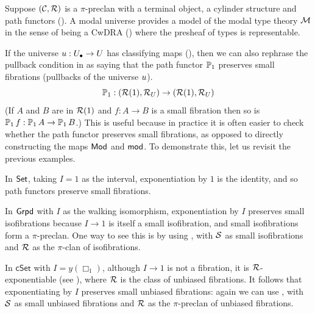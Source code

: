 \begin{proposition}
  Suppose $(\CC,\RR)$ is a $\pi$-preclan with a terminal object,
  a cylinder structure and path functors ().
  A modal universe provides a model of the modal type theory $\MM$
  in the sense of being a CwDRA (\cite[Definition 2]{birkedal2020})
  where the presheaf of types is representable.
\end{proposition}


If the universe $\uu : \Ulow \to \U$ has classifying maps
(),
then we can also rephrase the pullback condition in  as saying
that the path functor $\arr[1]$ preserves small fibrations
(pullbacks of the universe $\uu$).
\[ \arr[1] : (\RR(1),\RR_\U) \to (\RR(1),\RR_\U) \]
(If $A$ and $B$ are in $\RR(1)$ and $f : A \to B$ is a small fibration then
so is $\arr[1] f : \arr[1] A \to \arr[1] B$.)
This is useful because in practice it is often easier
to check whether the path functor preserves small fibrations,
as opposed to directly constructing the maps $\Mod$ and $\mod$.
To demonstrate this,
let us revisit the previous examples.

\begin{example}
  In $\Set$, taking $I = 1$ as the interval,
  exponentiation by $1$ is the identity,
  and so path functors preserve small fibrations.

  In $\Grpd$ with $I$ as the walking isomorphism,
  exponentiation by $I$ preserves small isofibrations because
  $I \to 1$ is itself a small isofibration,
  and small isofibrations form a $\pi$-preclan.
  One way to see this is by using ,
  with $\SS$ as small isofibrations and $\RR$ as the
  $\pi$-clan of isofibrations.

  In $\mathsf{cSet}$ with $I = y(\Box_1)$,
  although $I \to 1$ is not a fibration,
  it is $\RR$-exponentiable (see ),
  where $\RR$ is the class of unbiased fibrations.
  It follows that exponentiating by $I$ preserves small unbiased fibrations:
  again we can use ,
  with $\SS$ as small unbiased fibrations and $\RR$ as the
  $\pi$-preclan of unbiased fibrations.
\end{example}

